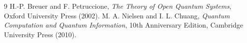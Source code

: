 \documentclass[10pt,a4paper]{article}
\begin{document}
\begin{thebibliography}{9}
H.-P. Breuer and F. Petruccione,
\emph{The Theory of Open Quantum Systems}, Oxford University Press (2002).
M. A. Nielsen and I. L. Chuang,
\emph{Quantum Computation and Quantum Information},
10th Anniversary Edition, Cambridge University Press (2010).
\end{thebibliography}
\end{document}

